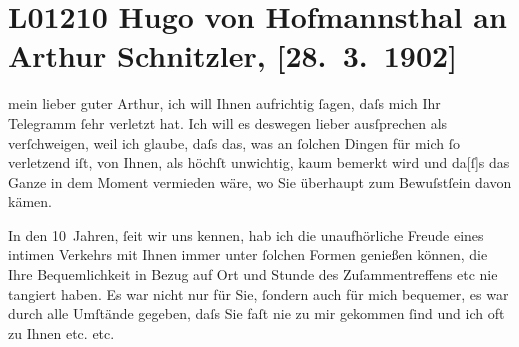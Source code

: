 

\section[Hugo von Hofmannsthal an Arthur Schnitzler, {[}28. 3. 1902{]}]{L01210 Hugo von Hofmannsthal an Arthur Schnitzler, {[}28. 3. 1902{]}}
\nopagebreak{}
\rehead{ }\normalsize\beginnumbering{}
\toendnotes[C]{\smallbreak\pagebreak[2]}
\toendnotes[C]{\smallbreak}
\pstart{}{\pb}mein lieber guter
                  Arthur,\pend\vspace{0.5em}
\pstart
           ich will Ihnen aufrichtig ſagen, daſs mich Ihr Telegramm ſehr verletzt hat. Ich will
               es deswegen lieber ausſprechen als verſchweigen, weil ich glaube, daſs das, was an
               ſolchen Dingen für mich ſo verletzend iſt, von Ihnen, als höchſt unwichtig, kaum {\pb}bemerkt wird und
                  da{[}ſ{]}s das Ganze in dem Moment vermieden wäre, wo Sie überhaupt
               zum Bewuſstſein davon kämen.\pend
           
\pstart
           In den 10 Jahren, ſeit wir uns kennen, hab ich die unaufhörliche Freude eines intimen
               Verkehrs mit Ihnen immer unter ſolchen Formen {\pb}genießen können, die Ihre
               Bequemlichkeit in Bezug auf Ort und Stunde des Zuſammentreffens etc nie tangiert
               haben. Es war nicht nur für Sie, ſondern auch für mich bequemer, es war durch alle
               Umſtände gegeben, daſs Sie faſt nie zu mir gekommen ſind und ich oft zu Ihnen etc.
               etc.\pend
           
